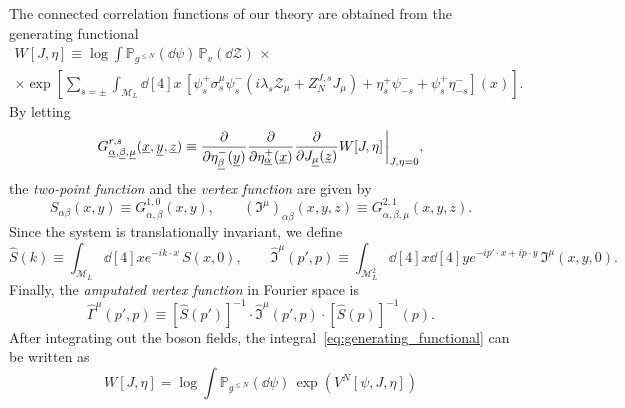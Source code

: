 \documentclass[a4paper, 11pt]{article}
\newcommand{\dgauss}[2]{\mathbb{P}_{#1}(\dd #2)}			%
\newcommand{\sing}[2]{{#1}^{#2}}							%
\theoremstyle{thm}
\begin{document}
The connected correlation functions of our theory are obtained from the generating functional
\begin{multline}
\label{eq:generating_functional}
W[J, \eta] \equiv \log \int \dgauss{\sing{g}{\le N}}{\psi} \, \dgauss{v}{\mathcal{Z}} \, \times \\
\times \exp \left[\sum_{s = \pm} \int_{\mathcal{M}_L} \!\! \dd[4]{x} \, [\psi^+_s \sigma^\mu_s \psi^-_s (i\lambda_s \mathcal{Z}_\mu + Z^{J, s}_N J_\mu) + \eta^+_s \psi^-_{-s} + \psi^+_s \eta^-_{-s}](x) \right].
\end{multline}
By letting
\begin{equation}
\label{eq:schwinger_functions}
G_{\underline{\alpha}, \underline{\beta}, \underline{\mu}}^{r,s}(\underline{x}, \underline{y}, \underline{z}) \equiv \frac{\partial}{\partial \eta^-_{\underline{\beta}}(\underline{y})} \frac{\partial}{\partial \eta^+_{\underline{\alpha}}(\underline{x})} \frac{\partial}{\partial J_{\underline{\mu}}(\underline{z})} W[J, \eta] \eval_{J, \eta = 0},
\end{equation}
the \emph{two-point function} and the \emph{vertex function} are given by
\begin{equation}
S_{\alpha \beta}(x, y) \equiv G_{\alpha, \beta}^{1, 0}(x, y), \qquad (\mathfrak{I}^\mu)_{\alpha \beta}(x, y, z) \equiv G_{\alpha, \beta, \mu}^{2, 1}(x, y, z).
\end{equation}
Since the system is translationally invariant, we define
\begin{equation}\label{ct}
\hat{S}(k) \equiv \int_{\mathcal{M}_L} \dd[4]{x} e^{-i k \cdot x} \, S(x, 0), \qquad
\hat{\mathfrak{I}}^\mu(p', p) \equiv \int_{\mathcal{M}_L^2} \dd[4]{x} \dd[4]{y} e^{-i p' \cdot x + i p \cdot y} \, \mathfrak{I}^\mu(x, y, 0).
\end{equation}
Finally, the \emph{amputated vertex function} in Fourier space is 
\begin{equation}
\hat{\Gamma}^\mu(p', p) \equiv [\hat{S}(p')]^{-1} \cdot \hat{\mathfrak{I}}^\mu(p', p) \cdot [\hat{S}(p)]^{-1}(p).
\end{equation}
After integrating out the boson fields, the integral~\eqref{eq:generating_functional} can be written as
\begin{equation}
\label{eq:generating_functional_fermionic}
W[J, \eta] = \log \int \dgauss{\sing{g}{\le N}}{\psi} \, \exp( \sing{V}{N}[\psi, J, \eta] )
\end{equation}
\end{document}
